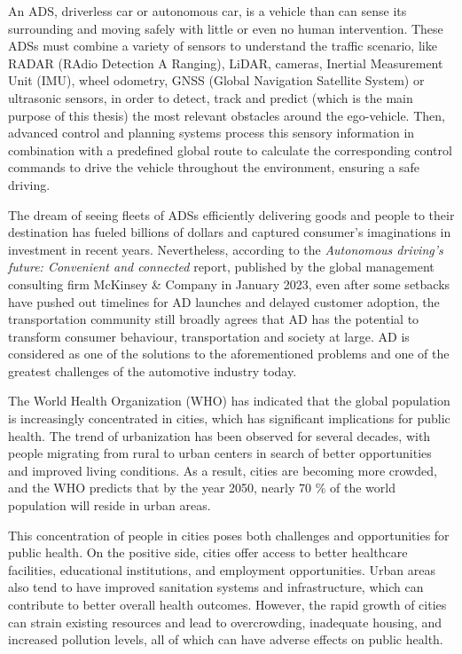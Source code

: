 An \ac{ADS}, driverless car or autonomous car, is a vehicle than can sense its surrounding and moving safely with little or even no human intervention. These \acp{ADS} must combine a variety of sensors to understand the traffic scenario, like RADAR (RAdio Detection A Ranging), \ac{LiDAR}, cameras, Inertial Measurement Unit (IMU), wheel odometry, GNSS (Global Navigation Satellite System) or ultrasonic sensors, in order to detect, track and predict (which is the main purpose of this thesis) the most relevant obstacles around the ego-vehicle. Then, advanced control and planning systems process this sensory information in combination with a predefined global route to calculate the corresponding control commands to drive the vehicle throughout the environment, ensuring a safe driving. 

The dream of seeing fleets of \acp{ADS} efficiently delivering goods and people to their destination has fueled billions of dollars and captured consumer's imaginations in investment in recent years. Nevertheless, according to the \textit{Autonomous driving's future: Convenient and connected} report, published by the global management consulting firm McKinsey \& Company in January 2023, even after some setbacks have pushed out timelines for \ac{AD} launches and delayed customer adoption, the transportation community still broadly agrees that \ac{AD} has the potential to transform consumer behaviour, transportation and society at large. \ac{AD} is considered as one of the solutions to the aforementioned problems and one of the greatest challenges of the automotive industry today. 

The World Health Organization (WHO) has indicated that the global population is increasingly concentrated in cities, which has significant implications for public health. The trend of urbanization has been observed for several decades, with people migrating from rural to urban centers in search of better opportunities and improved living conditions. As a result, cities are becoming more crowded, and the WHO predicts that by the year 2050, nearly 70 \% of the world population will reside in urban areas.

This concentration of people in cities poses both challenges and opportunities for public health. On the positive side, cities offer access to better healthcare facilities, educational institutions, and employment opportunities. Urban areas also tend to have improved sanitation systems and infrastructure, which can contribute to better overall health outcomes. However, the rapid growth of cities can strain existing resources and lead to overcrowding, inadequate housing, and increased pollution levels, all of which can have adverse effects on public health.

